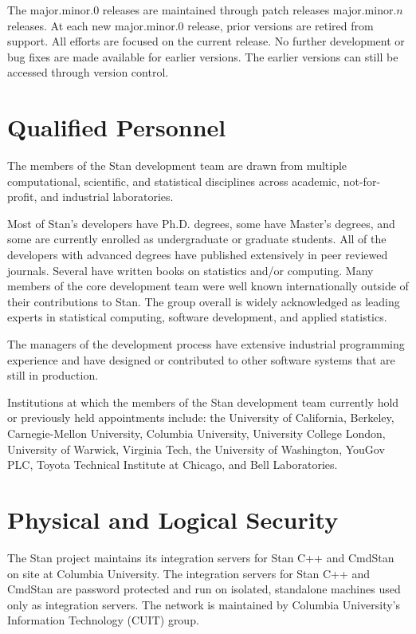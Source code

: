 The major.minor.0 releases are maintained through patch releases
major.minor.$n$ releases.  At each new major.minor.0 release, prior
versions are retired from support.  All efforts are focused on the
current release.  No further development or bug fixes are made
available for earlier versions.  The earlier versions can still be
accessed through version control.


\section{Qualified Personnel}

The members of the Stan development team are drawn from multiple
computational, scientific, and statistical disciplines across
academic, not-for-profit, and industrial laboratories. 

Most of Stan's developers have Ph.D. degrees, some have Master's
degrees, and some are currently enrolled as undergraduate or graduate
students. All of the developers with advanced degrees have published
extensively in peer reviewed journals. Several have written books on
statistics and/or computing. Many members of the core development team
were well known internationally outside of their contributions to Stan.
The group overall is widely acknowledged as leading experts in
statistical computing, software development, and applied statistics.

The managers of the development process have extensive industrial
programming experience and have designed or contributed to other
software systems that are still in production.

Institutions at which the members of the Stan development team
currently hold or previously held appointments include: the University
of California, Berkeley, Carnegie-Mellon University, Columbia
University, University College London, University of Warwick, Virginia
Tech, the University of Washington, YouGov PLC, Toyota Technical
Institute at Chicago, and Bell Laboratories.

\section{Physical and Logical Security}

The Stan project maintains its integration servers for Stan C++ and
CmdStan on site at Columbia University. The integration servers for
Stan C++ and CmdStan are password protected and run on isolated,
standalone machines used only as integration servers. The network is
maintained by Columbia University's Information Technology (CUIT)
group.

